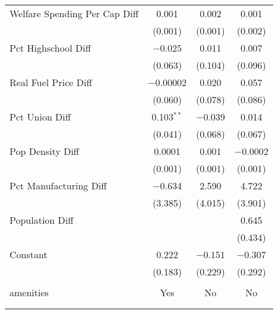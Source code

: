 \begin{table}[!htbp]
\begin{tabular}{@{\extracolsep{5pt}}lccc}
  Welfare Spending Per Cap Diff & 0.001 & 0.002 & 0.001 \\ 
  & (0.001) & (0.001) & (0.002) \\ 
  Pct Highschool Diff & $-$0.025 & 0.011 & 0.007 \\ 
  & (0.063) & (0.104) & (0.096) \\ 
  Real Fuel Price Diff & $-$0.00002 & 0.020 & 0.057 \\ 
  & (0.060) & (0.078) & (0.086) \\ 
  Pct Union Diff & 0.103$^{**}$ & $-$0.039 & 0.014 \\ 
  & (0.041) & (0.068) & (0.067) \\ 
  Pop Density Diff & 0.0001 & 0.001 & $-$0.0002 \\ 
  & (0.001) & (0.001) & (0.001) \\ 
  Pct Manufacturing Diff & $-$0.634 & 2.590 & 4.722 \\ 
  & (3.385) & (4.015) & (3.901) \\ 
  Population Diff &  &  & 0.645 \\ 
  &  &  & (0.434) \\ 
  Constant & 0.222 & $-$0.151 & $-$0.307 \\ 
  & (0.183) & (0.229) & (0.292) \\ 
 \hline \\[-1.8ex] 
amenities & Yes & No & No \\ 
\hline \\[-1.8ex] 
\hline 
\hline \\[-1.8ex] 
\end{tabular} 
\end{table} 
